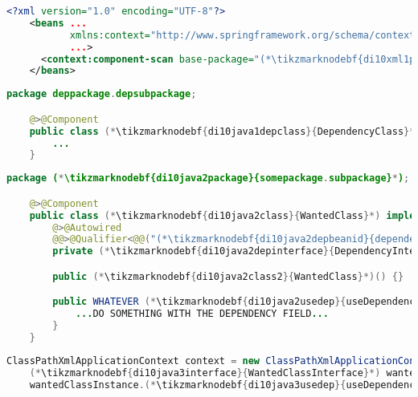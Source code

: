 \begin{lstlisting}[language=XML, title={Configuration XML}]
    <?xml version="1.0" encoding="UTF-8"?>
    <beans ...
           xmlns:context="http://www.springframework.org/schema/context"
           ...>
      <context:component-scan base-package="(*\tikzmarknodebf{di10xml1package}{somepackage.subpackage}[ForestGreen]*)"/>
    </beans>
\end{lstlisting}
\begin{lstlisting}[language=Java, title={Dependency class}]
    package deppackage.depsubpackage;

    @>@Component
    public class (*\tikzmarknodebf{di10java1depclass}{DependencyClass}*) implements (*\tikzmarknodebf{di10java1depinterface}{DependencyInterface}*) {
        ...
    }
\end{lstlisting}
\begin{lstlisting}[language=Java, title={Wanted class with the zero--parameter constructor}]
    package (*\tikzmarknodebf{di10java2package}{somepackage.subpackage}*);

    @>@Component
    public class (*\tikzmarknodebf{di10java2class}{WantedClass}*) implements (*\tikzmarknodebf{di10java2interface}{WantedClassInterface}*) {
        @>@Autowired
        @@>@Qualifier<@@("(*\tikzmarknodebf{di10java2depbeanid}{dependencyClass}[ForestGreen]*)")
        private (*\tikzmarknodebf{di10java2depinterface}{DependencyInterface}*) dependencyField;

        public (*\tikzmarknodebf{di10java2class2}{WantedClass}*)() {}

        public WHATEVER (*\tikzmarknodebf{di10java2usedep}{useDependency}*)() {
            ...DO SOMETHING WITH THE DEPENDENCY FIELD...
        }
    }
\end{lstlisting}
\begin{lstlisting}[language=Java, title={Usage}]
    ClassPathXmlApplicationContext context = new ClassPathXmlApplicationContext("configurationFile.xml");
    (*\tikzmarknodebf{di10java3interface}{WantedClassInterface}*) wantedClassInstance = context.getBean("(*\tikzmarknodebf{di10java3beanid}{wantedClass}[ForestGreen]*)", (*\tikzmarknodebf{di10java3interface2}{WantedClassInterface}*).class);
    wantedClassInstance.(*\tikzmarknodebf{di10java3usedep}{useDependency}*)();
\end{lstlisting}
\newpage


